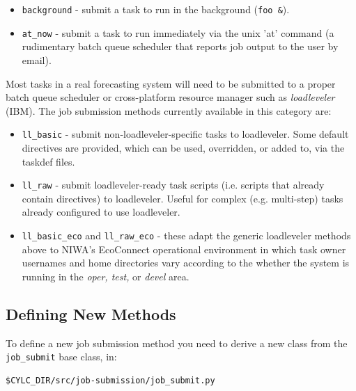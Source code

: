 \documentclass[11pt,a4paper]{article}
\begin{document}
\begin{itemize}

    \item \lstinline=background= - submit a task to run in the
        background (\lstinline=foo &=). 

     \item \lstinline=at_now= - submit a task to run immediately via the
         unix 'at' command (a rudimentary batch queue scheduler that
         reports job output to the user by email).

\end{itemize}

Most tasks in a real forecasting system will need to be submitted to a
proper batch queue scheduler or cross-platform resource
manager such as {\em loadleveler} (IBM). The job submission methods 
currently available in this category are:

\begin{itemize} 
    
    \item \lstinline=ll_basic= - submit non-loadleveler-specific tasks
        to loadleveler.  Some default directives are provided, which 
        can be used, overridden, or added to, via the taskdef files.

    \item \lstinline=ll_raw= - submit loadleveler-ready task scripts
        (i.e. scripts that already contain directives) to loadleveler.
        Useful for complex (e.g. multi-step) tasks already configured 
        to use loadleveler.

    \item \lstinline=ll_basic_eco= and \lstinline=ll_raw_eco= - these
        adapt the generic loadleveler methods above to NIWA's EcoConnect
        operational environment in which task owner usernames and home
        directories vary according to the whether the system is running
        in the {\em oper, test,} or {\em devel} area.

\end{itemize}


\subsection{Defining New Methods}

To define a new job submission method you need to derive a new class
from the \lstinline=job_submit= base class, in:

\begin{lstlisting}
$CYLC_DIR/src/job-submission/job_submit.py
\end{lstlisting}
\end{document}

